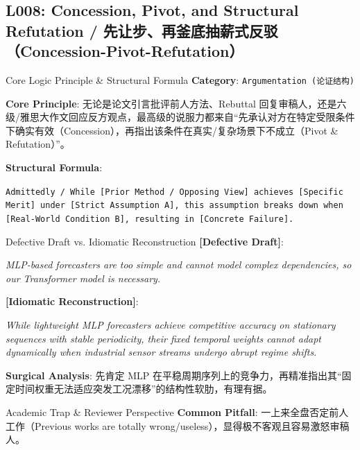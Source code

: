 \subsection{L008: Concession, Pivot, and Structural Refutation / 先让步、再釜底抽薪式反驳（Concession-Pivot-Refutation）}\label{sec:logic:L008}
\begin{ConceptBox}{Core Logic Principle \& Structural Formula}
\textbf{Category}: \texttt{Argumentation (论证结构)}\par\vspace{3pt}
\textbf{Core Principle}: 无论是论文引言批评前人方法、Rebuttal 回复审稿人，还是六级/雅思大作文回应反方观点，最高级的说服力都来自“先承认对方在特定受限条件下确实有效（Concession），再指出该条件在真实/复杂场景下不成立（Pivot \& Refutation）”。\par\vspace{4pt}
\textbf{Structural Formula}:\par\noindent\texttt{Admittedly / While [Prior Method / Opposing View] achieves [Specific Merit] under [Strict Assumption A], this assumption breaks down when [Real-World Condition B], resulting in [Concrete Failure].}
\end{ConceptBox}
\begin{ExampleBox}{Defective Draft vs. Idiomatic Reconstruction}
\textbf{\color{TargetHighlight}[Defective Draft]}:\par\textit{MLP-based forecasters are too simple and cannot model complex dependencies, so our Transformer model is necessary.}\par\vspace{4pt}
\textbf{\color{AcadNavy}[Idiomatic Reconstruction]}:\par\textit{While lightweight MLP forecasters achieve competitive accuracy on stationary sequences with stable periodicity, their fixed temporal weights cannot adapt dynamically when industrial sensor streams undergo abrupt regime shifts.}\par\vspace{4pt}
\textbf{Surgical Analysis}: 先肯定 MLP 在平稳周期序列上的竞争力，再精准指出其“固定时间权重无法适应突发工况漂移”的结构性软肋，有理有据。
\end{ExampleBox}
\begin{TipBox}{Academic Trap \& Reviewer Perspective}
\textbf{Common Pitfall}: 一上来全盘否定前人工作（Previous works are totally wrong/useless），显得极不客观且容易激怒审稿人。
\end{TipBox}
\vspace{6pt}
